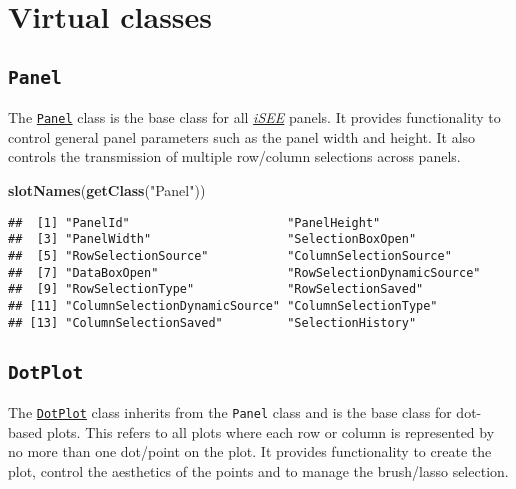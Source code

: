 \documentclass[
]{book}
\newenvironment{Shaded}{\begin{snugshade}}{\end{snugshade}}
\newcommand{\KeywordTok}[1]{\textcolor[rgb]{0.13,0.29,0.53}{\textbf{#1}}}
\newcommand{\NormalTok}[1]{#1}
\newcommand{\StringTok}[1]{\textcolor[rgb]{0.31,0.60,0.02}{#1}}
\begin{document}
\hypertarget{virtual-classes}{%
\section{Virtual classes}\label{virtual-classes}}

\hypertarget{panel}{%
\subsection{\texorpdfstring{\texttt{Panel}}{Panel}}\label{panel}}

The \href{https://isee.github.io/iSEE/reference/Panel-class.html}{\texttt{Panel}} class is the base class for all \emph{\href{https://bioconductor.org/packages/3.11/iSEE}{iSEE}} panels.
It provides functionality to control general panel parameters such as the panel width and height.
It also controls the transmission of multiple row/column selections across panels.

\begin{Shaded}
\begin{Highlighting}[]
\KeywordTok{slotNames}\NormalTok{(}\KeywordTok{getClass}\NormalTok{(}\StringTok{"Panel"}\NormalTok{))}
\end{Highlighting}
\end{Shaded}

\begin{verbatim}
##  [1] "PanelId"                      "PanelHeight"                 
##  [3] "PanelWidth"                   "SelectionBoxOpen"            
##  [5] "RowSelectionSource"           "ColumnSelectionSource"       
##  [7] "DataBoxOpen"                  "RowSelectionDynamicSource"   
##  [9] "RowSelectionType"             "RowSelectionSaved"           
## [11] "ColumnSelectionDynamicSource" "ColumnSelectionType"         
## [13] "ColumnSelectionSaved"         "SelectionHistory"
\end{verbatim}

\hypertarget{dotplot}{%
\subsection{\texorpdfstring{\texttt{DotPlot}}{DotPlot}}\label{dotplot}}

The \href{https://isee.github.io/iSEE/reference/DotPlot-class.html}{\texttt{DotPlot}} class inherits from the \texttt{Panel} class and is the base class for dot-based plots.
This refers to all plots where each row or column is represented by no more than one dot/point on the plot.
It provides functionality to create the plot, control the aesthetics of the points and to manage the brush/lasso selection.
\end{document}
